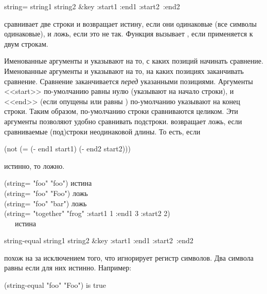 \begin{defun}[Функция]
string= string1 string2 &key :start1 :end1 :start2~:end2

 сравнивает две строки и возвращает истину, если они одинаковые
(все символы одинаковые), и ложь, если это не так.
Функция  вызывает , если применяется к двум строкам.

Именованные аргументы  и  указывают на то, с каких
позиций начинать сравнение.
Именованные аргументы  и  указывают на то, на каких
позициях заканчивать сравнение.
Сравнение заканчивается \emph{перед} указанными позициями.
Аргументы <<start>> по-умолчанию равны нулю (указывают на начало строки), и 
<<end>> (если опущены или равны {\false}) по-умолчанию указывают на конец
строки. Таким образом, по-умолчанию строки сравниваются целиком.
Эти аргументы позволяют удобно сравнивать подстроки.
 возвращает ложь, если сравниваемые (под)строки неодинаковой
длины. То есть, если 
\begin{lisp}
(not (= (- end1 start1) (- end2 start2)))
\end{lisp}
истинно, то  ложно.

\begin{lisp}
(string= "foo" "foo") \textrm{истина} \\
(string= "foo" "Foo") \textrm{ложь} \\
(string= "foo" "bar") \textrm{ложь} \\
(string= "together" "frog" :start1 1 :end1 3 :start2 2) \\
~~~\textrm{истина}
\end{lisp}
\end{defun}

\begin{defun}[Функция]
string-equal string1 string2 &key :start1 :end1 :start2~:end2

 похож на  за исключением того, что игнорирует
регистр символов. Два символа равны если  для них истинно.
Например:
\begin{lisp}
(string-equal "foo" "Foo") \textrm{is true}
\end{lisp}
\end{defun}

